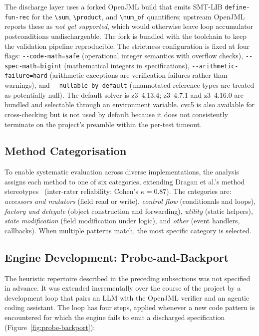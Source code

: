 The discharge layer uses a forked OpenJML build that emits SMT-LIB \texttt{define-fun-rec} for the \texttt{\textbackslash sum}, \texttt{\textbackslash product}, and \texttt{\textbackslash num\_of} quantifiers; upstream OpenJML reports these as \emph{not yet supported}, which would otherwise leave loop accumulator postconditions undischargeable. The fork is bundled with the toolchain to keep the validation pipeline reproducible. The strictness configuration is fixed at four flags: \texttt{-{}-code-math=safe} (operational integer semantics with overflow checks), \texttt{-{}-spec-math=bigint} (mathematical integers in specifications), \texttt{-{}-arithmetic-failure=hard} (arithmetic exceptions are verification failures rather than warnings), and \texttt{-{}-nullable-by-default} (unannotated reference types are treated as potentially null). The default solver is z3~4.13.4; z3~4.7.1 and z3~4.16.0 are bundled and selectable through an environment variable. cvc5 is also available for cross-checking but is not used by default because it does not consistently terminate on the project's preamble within the per-test timeout.

\subsection{Method Categorisation}
\label{subsec:categorization}

To enable systematic evaluation across diverse implementations, the analysis assigns each method to one of six categories, extending Dragan et al.'s method stereotypes~\cite{dragan2006reverse} (inter-rater reliability: Cohen's $\kappa = 0.87$). The categories are: \emph{accessors and mutators} (field read or write), \emph{control flow} (conditionals and loops), \emph{factory and delegate} (object construction and forwarding), \emph{utility} (static helpers), \emph{state modification} (field modification under logic), and \emph{other} (event handlers, callbacks). When multiple patterns match, the most specific category is selected.

\subsection{Engine Development: Probe-and-Backport}
\label{subsec:probe-backport}

The heuristic repertoire described in the preceding subsections was not specified in advance. It was extended incrementally over the course of the project by a development loop that pairs an LLM with the OpenJML verifier and an agentic coding assistant. The loop has four steps, applied whenever a new code pattern is encountered for which the engine fails to emit a discharged specification (Figure~\ref{fig:probe-backport}):

